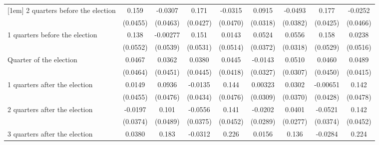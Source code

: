 \begin{table}[htbp]
\begin{tabular}{l*{8}{c}}
[1em]
 2 quarters before the election&       0.159\sym{***}&     -0.0307         &       0.171\sym{***}&     -0.0315         &      0.0915\sym{**} &     -0.0493         &       0.177\sym{***}&     -0.0252         \\
                    &    (0.0455)         &    (0.0463)         &    (0.0427)         &    (0.0470)         &    (0.0318)         &    (0.0382)         &    (0.0425)         &    (0.0466)         \\
[1em]
 1 quarters before the election&       0.138\sym{*}  &    -0.00277         &       0.151\sym{**} &      0.0143         &      0.0524         &      0.0556         &       0.158\sym{**} &      0.0238         \\
                    &    (0.0552)         &    (0.0539)         &    (0.0531)         &    (0.0514)         &    (0.0372)         &    (0.0318)         &    (0.0529)         &    (0.0516)         \\
[1em]
Quarter of the election&      0.0467         &      0.0362         &      0.0380         &      0.0445         &     -0.0143         &      0.0510         &      0.0460         &      0.0489         \\
                    &    (0.0464)         &    (0.0451)         &    (0.0445)         &    (0.0418)         &    (0.0327)         &    (0.0307)         &    (0.0450)         &    (0.0415)         \\
[1em]
 1 quarters after the election&      0.0149         &      0.0936\sym{*}  &     -0.0135         &       0.144\sym{**} &     0.00323         &      0.0302         &    -0.00651         &       0.142\sym{**} \\
                    &    (0.0455)         &    (0.0476)         &    (0.0434)         &    (0.0476)         &    (0.0309)         &    (0.0370)         &    (0.0428)         &    (0.0478)         \\
[1em]
 2 quarters after the election&     -0.0197         &       0.101\sym{*}  &     -0.0556         &       0.141\sym{**} &     -0.0202         &      0.0401         &     -0.0521         &       0.142\sym{**} \\
                    &    (0.0374)         &    (0.0489)         &    (0.0375)         &    (0.0452)         &    (0.0289)         &    (0.0277)         &    (0.0374)         &    (0.0452)         \\
[1em]
 3 quarters after the election&      0.0380         &       0.183\sym{***}&     -0.0312         &       0.226\sym{***}&      0.0156         &       0.136\sym{***}&     -0.0284         &       0.224\sym{***}\\

\end{tabular}
\end{table}
